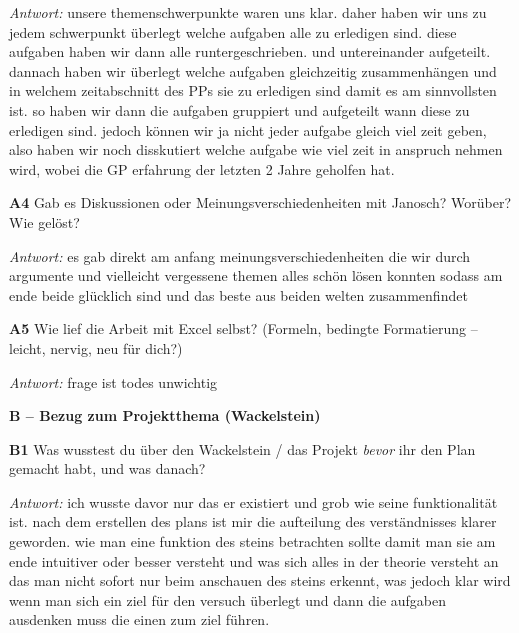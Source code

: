 {\par\noindent\emph{Antwort:} unsere themenschwerpunkte waren uns klar. daher haben wir uns zu jedem schwerpunkt überlegt welche aufgaben alle zu erledigen sind. diese aufgaben haben wir dann alle runtergeschrieben. und untereinander aufgeteilt. dannach haben wir überlegt welche aufgaben gleichzeitig zusammenhängen und in welchem zeitabschnitt des PPs sie zu erledigen sind damit es am sinnvollsten ist. so haben wir dann die aufgaben gruppiert und aufgeteilt wann diese zu erledigen sind. jedoch können wir ja nicht jeder aufgabe gleich viel zeit geben, also haben wir noch disskutiert welche aufgabe wie viel zeit in anspruch nehmen wird, wobei die GP erfahrung der letzten 2 Jahre geholfen hat.\par\smallskip
\par\noindent \textbf{A4} Gab es Diskussionen oder Meinungsverschiedenheiten mit Janosch? Worüber? Wie gelöst?\par
\par\noindent\emph{Antwort:} es gab direkt am anfang meinungsverschiedenheiten die wir durch argumente und vielleicht vergessene themen alles schön lösen konnten sodass am ende beide glücklich sind und das beste aus beiden welten zusammenfindet\par\smallskip
\par\noindent \textbf{A5} Wie lief die Arbeit mit Excel selbst? (Formeln, bedingte Formatierung – leicht, nervig, neu für dich?)\par
\par\noindent\emph{Antwort:} frage ist todes unwichtig\par\smallskip
\par\medskip\noindent\textbf{B – Bezug zum Projektthema (Wackelstein)}\par
\par\noindent \textbf{B1} Was wusstest du über den Wackelstein / das Projekt \emph{bevor} ihr den Plan gemacht habt, und was danach?\par
\par\noindent\emph{Antwort:} ich wusste davor nur das er existiert und grob wie seine funktionalität ist. nach dem erstellen des plans ist mir die aufteilung des verständnisses klarer geworden. wie man eine funktion des steins betrachten sollte damit man sie am ende intuitiver oder besser versteht und was sich alles in der theorie versteht an das man nicht sofort nur beim anschauen des steins erkennt, was jedoch klar wird wenn man sich ein ziel für den versuch überlegt und dann die aufgaben ausdenken muss die einen zum ziel führen.\par\smallskip
}
